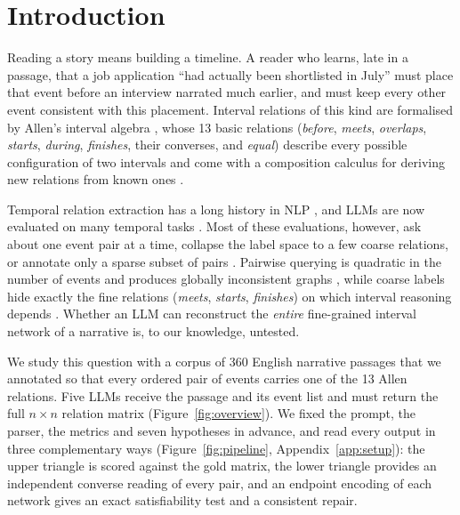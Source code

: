 \documentclass[11pt]{article}
\begin{document}
\section{Introduction}
\label{sec:intro}

Reading a story means building a timeline. A reader who learns, late in a passage, that a job application ``had actually been shortlisted in July'' must place that event before an interview narrated much earlier, and must keep every other event consistent with this placement. Interval relations of this kind are formalised by Allen's interval algebra \citep{allen1983maintaining}, whose 13 basic relations (\emph{before}, \emph{meets}, \emph{overlaps}, \emph{starts}, \emph{during}, \emph{finishes}, their converses, and \emph{equal}) describe every possible configuration of two intervals and come with a composition calculus for deriving new relations from known ones \citep{vilain1990constraint,nebel1995reasoning}.

Temporal relation extraction has a long history in NLP \citep{pustejovsky2003timeml,uzzaman2012tempeval,leeuwenberg2019survey}, and LLMs are now evaluated on many temporal tasks \citep{chu-etal-2024-timebench,wang-zhao-2024-tram,qiu-etal-2024-large}. Most of these evaluations, however, ask about one event pair at a time, collapse the label space to a few coarse relations, or annotate only a sparse subset of pairs \citep{cassidy-etal-2014-annotation,ning2018multi}. Pairwise querying is quadratic in the number of events and produces globally inconsistent graphs \citep{eirew2025beyond,kougia-etal-2024-analysing}, while coarse labels hide exactly the fine relations (\emph{meets}, \emph{starts}, \emph{finishes}) on which interval reasoning depends \citep{islakoglu-kalo-2025-chronosense}. Whether an LLM can reconstruct the \emph{entire} fine-grained interval network of a narrative is, to our knowledge, untested.

We study this question with a corpus of 360 English narrative passages that we annotated so that every ordered pair of events carries one of the 13 Allen relations. Five LLMs receive the passage and its event list and must return the full $n\times n$ relation matrix (Figure~\ref{fig:overview}). We fixed the prompt, the parser, the metrics and seven hypotheses in advance, and read every output in three complementary ways (Figure~\ref{fig:pipeline}, Appendix~\ref{app:setup}): the upper triangle is scored against the gold matrix, the lower triangle provides an independent converse reading of every pair, and an endpoint encoding of each network gives an exact satisfiability test and a consistent repair.
\end{document}
